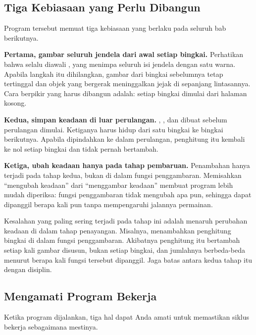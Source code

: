 \subsection{Tiga Kebiasaan yang Perlu Dibangun}

Program tersebut memuat tiga kebiasaan yang berlaku pada seluruh bab
berikutnya.

\textbf{Pertama, gambar seluruh jendela dari awal setiap bingkai.} Perhatikan
bahwa  selalu diawali , yang menimpa
seluruh isi jendela dengan satu warna. Apabila langkah itu dihilangkan,
gambar dari bingkai sebelumnya tetap tertinggal dan objek yang bergerak
meninggalkan jejak di sepanjang lintasannya. Cara berpikir yang harus
dibangun adalah: setiap bingkai dimulai dari halaman kosong.

\textbf{Kedua, simpan keadaan di luar perulangan.}
, , dan  dibuat sebelum
perulangan dimulai. Ketiganya harus hidup dari satu bingkai ke bingkai
berikutnya. Apabila  dipindahkan ke dalam perulangan,
penghitung itu kembali ke nol setiap bingkai dan tidak pernah bertambah.

\textbf{Ketiga, ubah keadaan hanya pada tahap pembaruan.}
Penambahan  hanya terjadi pada tahap kedua, bukan di dalam
fungsi penggambaran. Memisahkan ``mengubah keadaan'' dari ``menggambar
keadaan'' membuat program lebih mudah diperiksa: fungsi penggambaran tidak
mengubah apa pun, sehingga dapat dipanggil berapa kali pun tanpa
mempengaruhi jalannya permainan.

\begin{peringatanbox}
Kesalahan yang paling sering terjadi pada tahap ini adalah menaruh
perubahan keadaan di dalam tahap penayangan. Misalnya, menambahkan
penghitung bingkai di dalam fungsi penggambaran. Akibatnya penghitung itu
bertambah setiap kali gambar disusun, bukan setiap bingkai, dan jumlahnya
berbeda-beda menurut berapa kali fungsi tersebut dipanggil. Jaga batas
antara kedua tahap itu dengan disiplin.
\end{peringatanbox}

\subsection{Mengamati Program Bekerja}

Ketika program dijalankan, tiga hal dapat Anda amati untuk memastikan siklus
bekerja sebagaimana mestinya.

